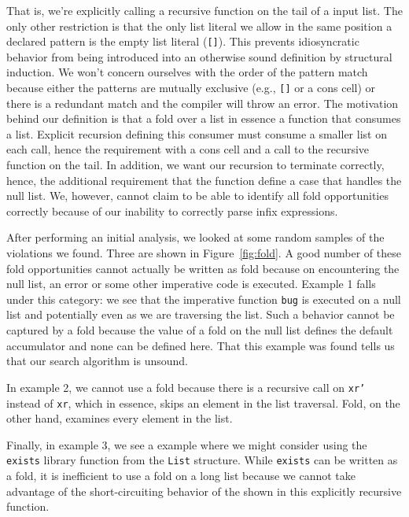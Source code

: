 \documentclass[12pt,abstracton]{scrartcl}
\begin{document}
That is, we're explicitly calling a recursive function on the tail of a input list.
The only other restriction is that the only list literal we allow in the same position
a declared pattern is the empty list literal (\texttt{[]}). This prevents idiosyncratic
behavior from being introduced into an otherwise sound definition by structural induction.
We won't concern ourselves with the order of the pattern match because either the patterns
are mutually exclusive (e.g., \texttt{[]} or a cons cell) or there is a redundant match
and the compiler will throw an error.
The motivation behind our definition is that a fold over a list in essence
a function that consumes a list. Explicit recursion defining this consumer must
consume a smaller list on each call, hence the requirement with a cons cell and a
call to the recursive function on the tail. In addition, we want our recursion to terminate
correctly, hence, the additional requirement that the function define a case that handles
the null list.
We, however, cannot claim to be able to identify all
fold opportunities correctly because of our inability to correctly parse infix expressions.

After performing an initial analysis, we looked at some
random samples of the violations we found.
Three are shown in Figure~\ref{fig:fold}.
A good number of these fold opportunities cannot actually
be written as fold because on encountering the null list, an error or
some other imperative code is executed. Example 1 falls under this category:
we see that the imperative function \texttt{bug} is executed
on a null list and potentially even as we are traversing the list.
Such a behavior cannot be captured by a fold because the value of a
fold on the null list defines the default accumulator and none
can be defined here.
That this example was found tells us that our search algorithm is unsound.

In example 2, we cannot use a fold because 
there is a recursive call on \texttt{xr'} instead of \texttt{xr},
which in essence, skips an element in the list traversal.
Fold, on the other hand, examines every element in the list.

Finally, in example 3, we see a example where we might consider
using the \texttt{exists} library function from the \texttt{List}
structure. While \texttt{exists} can be written as a fold,
it is inefficient to use a fold on a long list because
we cannot take advantage of the short-circuiting behavior
of the shown in this explicitly recursive function.
\end{document}
